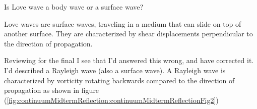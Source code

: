 \begin{Exercise}[title={Love waves.}, label={problem:elastic:displacements:midtermQ1d}]
Is Love wave a body wave or a surface wave?
\end{Exercise}

\begin{Answer}[ref={problem:elastic:displacements:midtermQ1d}]
Love waves are surface waves, traveling in a medium that can slide on top of another surface.  They are characterized by shear displacements perpendicular to the direction of propagation.

Reviewing for the final I see that I'd answered this wrong, and have corrected it.  I'd described a Rayleigh wave (also a surface wave).  A Rayleigh wave is characterized by vorticity rotating backwards compared to the direction of propagation as shown in figure (\ref{fig:continuumMidtermReflection:continuumMidtermReflectionFig2})


\end{Answer}

